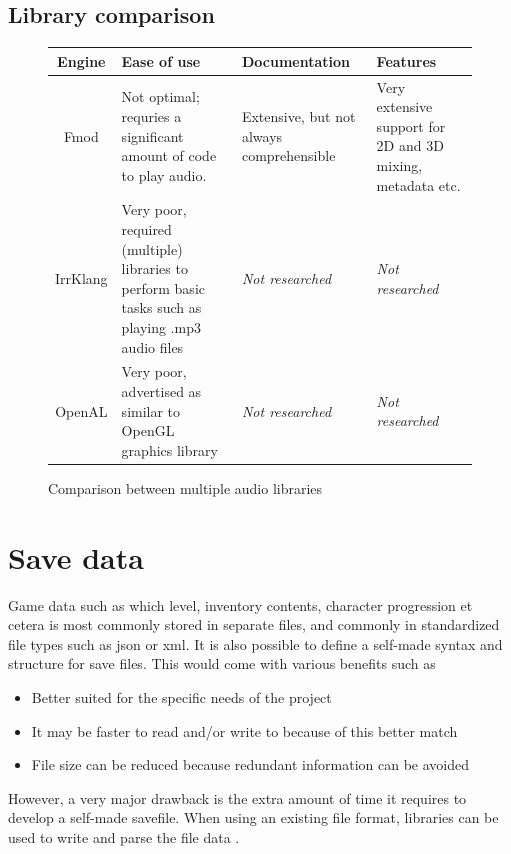 \documentclass{article} %
\begin{document}
\subsection{Library comparison}
\begin{figure}[h!]
	\centering
	\begin{tabularx}{\textwidth}{|c|X|X|X|} \hline
		\textbf{Engine} & \textbf{Ease of use}                                                                             & \textbf{Documentation}                   & \textbf{Features}                                          \\ \hline
		Fmod            & Not optimal; requries a significant amount of code to play audio.                                & Extensive, but not always comprehensible & Very extensive support for 2D and 3D mixing, metadata etc. \\ \hline
		IrrKlang        & Very poor, required (multiple) libraries to perform basic tasks such as playing .mp3 audio files & \textit{Not researched}                  & \textit{Not researched}                                    \\ \hline
		OpenAL          & Very poor, advertised as similar to OpenGL graphics library                                      & \textit{Not researched}                  & \textit{Not researched}                                    \\ \hline
	\end{tabularx}
	\caption{Comparison between multiple audio libraries}
	\label{fig:audioLibComparison}
\end{figure}

\section{Save data}
Game data such as which level, inventory contents, character progression et cetera is most commonly stored in separate files, and commonly in standardized file types such as json or xml.
It is also possible to define a self-made syntax and structure for save files. This would come with various benefits such as
\begin{itemize}
	\item Better suited for the specific needs of the project
	\item It may be faster to read and/or write to because of this better match
	\item File size can be reduced because redundant information can be avoided
\end{itemize}
However, a very major drawback is the extra amount of time it requires to develop a self-made savefile.
When using an existing file format, libraries can be used to write and parse the file data \cite{stackUser35344} \cite{LazyFoo}.
\end{document}
